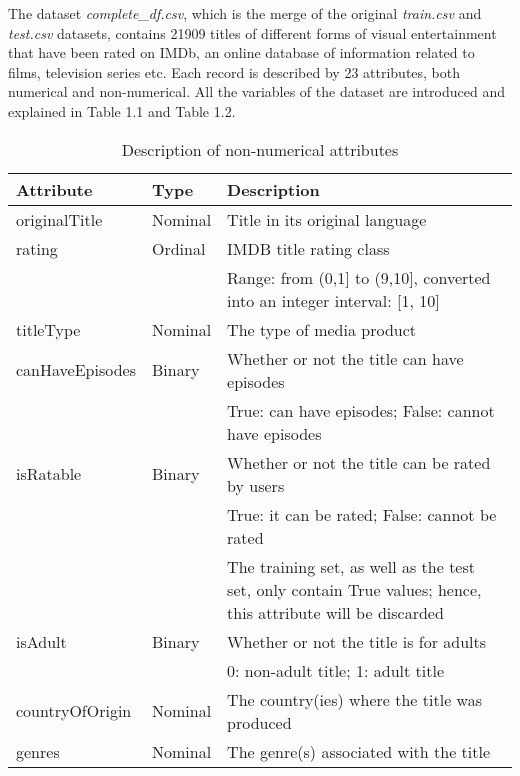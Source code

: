 % 


The dataset \textit{complete\_df.csv}, which is the merge of the original \textit{train.csv} and \textit{test.csv} datasets, contains 21909 titles of different forms of visual entertainment that have been rated on IMDb, an online database of information related to films, television series etc. 
Each record is described by 23 attributes, both numerical and non-numerical. 
All the variables of the dataset are introduced and explained in Table 1.1 and Table 1.2.
\begin{table}[h!]
    \centering
    \begin{tabularx}{\textwidth}{|l|l|X|} %
        \hline
        \textbf{Attribute} & \textbf{Type} & \textbf{Description} \\ 
        \hline
        originalTitle & Nominal & Title in its original language \\  
        \hline
        rating & Ordinal & IMDB title rating class \\
        & & Range: from (0,1] to (9,10], converted into an integer interval: [1, 10]\\ 
        \hline
        titleType & Nominal & The type of media product \\ 
        \hline
        canHaveEpisodes & Binary & Whether or not the title can have episodes \\ 
        & & True: can have episodes; False: cannot have episodes \\ 
        \hline
        isRatable & Binary & Whether or not the title can be rated by users \\ 
        & & True: it can be rated; False: cannot be rated \\
        & & The training set, as well as the test set, only contain True values; hence, this attribute will be discarded \\
        \hline
        isAdult & Binary & Whether or not the title is for adults \\ 
        & & 0: non-adult title; 1: adult title \\ 
        \hline
        countryOfOrigin & Nominal & The country(ies) where the title was produced \\ 
        \hline
        genres & Nominal & The genre(s) associated with the title \\ 
        \hline
    \end{tabularx}
    \caption{Description of non-numerical attributes}
    \label{tab:attributes}
\end{table}

